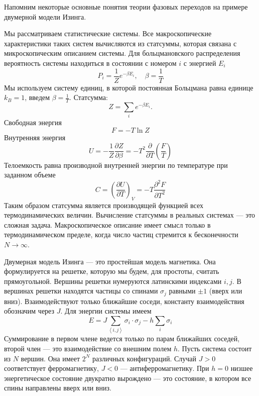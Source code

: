 \documentclass[a4paper,12pt]{article} \usepackage[utf8x]{inputenc} \usepackage[russian]{babel}
\theoremstyle{definition} \newtheorem{corollary}{Corollary}[theorem] \theoremstyle{definition}
\begin{document}
Напомним некоторые основные понятия теории фазовых переходов на примере двумерной модели Изинга.

Мы рассматриваем статистические системы. Все макроскопические характеристики таких систем
вычисляются из статсуммы, которая связана с микроскопическим описанием системы. Для больцмановского
распределения вероятность системы находиться в состоянии с номером $i$ с энергией $E_i$
\begin{equation}
  \label{eq:2} P_i=\frac{1}{Z}e^{-\beta E_i}, \quad \beta=\frac{1}{T}
\end{equation} Мы используем систему единиц, в которой постоянная Больцмана равна единице $k_B=1$,
введем $\beta=\frac{1}{T}$. Статсумма:
\begin{equation}
  \label{eq:3} Z=\sum_i e^{-\beta E_i}.
\end{equation} Свободная энергия
\begin{equation}
  \label{eq:4} F=-T\ln Z
\end{equation} Внутренняя энергия
\begin{equation}
  \label{eq:5} U=-\frac{1}{Z}\frac{\partial Z}{\partial \beta}=-T^2 \frac{\partial}{\partial
T}\left(\frac{F}{T}\right)
\end{equation} Телоемкость равна производной внутренней энергии по температуре при заданном объеме
\begin{equation}
  \label{eq:6} C=\left(\frac{\partial U}{\partial T}\right)_V=-T\frac{\partial^2 F}{\partial T^2}
\end{equation} Таким образом статсумма является производящей функцией всех термодинамических
величин. Вычисление статсуммы в реальных системах --- это сложная задача. Макроскопическое описание
имеет смысл только в термодинамическом пределе, когда число частиц стремится к бесконечности $N\to
\infty$.

Двумерная модель Изинга --- это простейшая модель магнетика. Она формулируется на решетке, которую
мы будем, для простоты, считать прямоугольной. Вершины решетки нумеруются латинскими индексами
$i,j$. В вершинах решетки находятся частицы со спинами $\sigma_j$ равными $\pm 1$ (вверх или вниз).
Взаимодействуют только ближайшие соседи, константу взаимодействия обозначим через $J$. Для энергии
системы имеем
\begin{equation}
  \label{eq:1} E=J\sum_{\left<i,j\right>} \sigma_i\cdot \sigma_j-h\sum_i \sigma_i
\end{equation} Суммирование в первом члене ведется только по парам ближайших соседей, второй член
--- это взаимодействие со внешним полем $h$. Пусть система состоит из $N$ вершин. Она имеет $2^N$
различных конфигураций. Случай $J>0$ соответствует ферромагнетику, $J<0$ --- антиферромагнетику. При
$h=0$ низшее энергетическое состояние двукратно вырождено --- это состояние, в котором все спины
направлены вверх или вниз.
\end{document}
